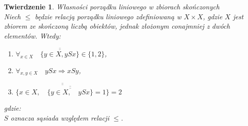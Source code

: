 \documentclass[12pt,a4paper]{report}
\newtheorem{theorem}{Twierdzenie}[section]
\begin{document}
\newcommand{\licznosc}[1]{\overline{\overline{#1}}}
\begin{theorem}{Własności porządku liniowego w zbiorach skończonych\\}
Niech $\leq$ będzie relacją porządku liniowego zdefiniowaną w $X \times X$, gdzie $X$ jest zbiorem ze skończoną liczbą obiektów, jednak złożonym conajmniej z dwóch elementów. Wtedy:
\begin{enumerate}
\item $\forall_{x \in X} \quad \licznosc{\{y \in X, ySx\}} \in \{1,2\}$,
\item $\forall_{x, y \in X} \quad ySx \Rightarrow xSy $,
\item $\licznosc{\{x \in X, \quad \licznosc{\{y \in X, \quad ySx \}}=1\}}=2 $
\end{enumerate}
gdzie:\\
$S$ oznacza sąsiada względem relacji $\leq$.
\end{theorem}
\end{document}
